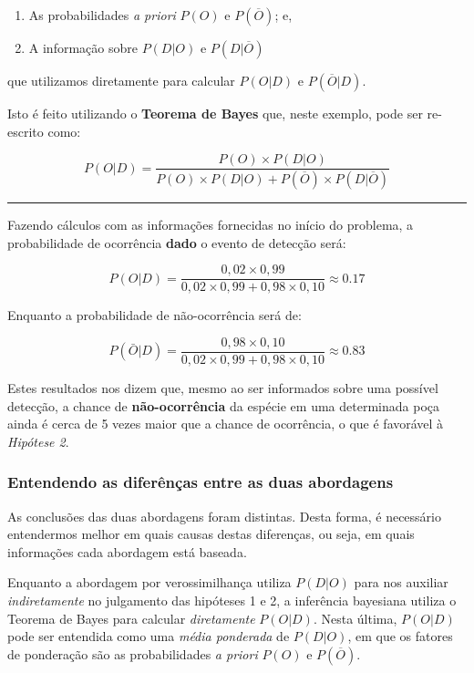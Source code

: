 \documentclass[
]{book}
\begin{document}
\begin{enumerate}
\def\labelenumi{\arabic{enumi}.}
\item
  As probabilidades \emph{a priori} \(P(O)\) e \(P(\overline{O})\); e,
\item
  A informação sobre \(P(D|O)\) e \(P(D|\overline{O})\)
\end{enumerate}

que utilizamos diretamente para calcular \(P(O|D)\) e \(P(\overline{O}|D)\).

Isto é feito utilizando o \textbf{Teorema de Bayes} que, neste exemplo, pode ser re-escrito como:

\[P(O|D) = \frac{P(O) \times P(D|O)}{P(O) \times P(D|O) + P(\overline{O}) \times P(D|\overline{O})}\]

\begin{center}\rule{0.5\linewidth}{0.5pt}\end{center}

Fazendo cálculos com as informações fornecidas no início do problema, a probabilidade de ocorrência \textbf{dado} o evento de detecção será:

\[P(O|D) = \frac{0,02 \times 0,99}{0,02 \times 0,99 + 0,98 \times 0,10} \approx 0.17\]

Enquanto a probabilidade de não-ocorrência será de:

\[P(\bar{O}|D) = \frac{0,98 \times 0,10}{0,02 \times 0,99 + 0,98 \times 0,10} \approx 0.83\]

Estes resultados nos dizem que, mesmo ao ser informados sobre uma possível detecção, a chance de \textbf{não-ocorrência} da espécie em uma determinada poça ainda é cerca de 5 vezes maior que a chance de ocorrência, o que é favorável à \emph{Hipótese 2}.

\hypertarget{entendendo-as-diferuxeanuxe7as-entre-as-duas-abordagens}{%
\subsubsection*{Entendendo as diferênças entre as duas abordagens}\label{entendendo-as-diferuxeanuxe7as-entre-as-duas-abordagens}}

As conclusões das duas abordagens foram distintas. Desta forma, é necessário entendermos melhor em quais causas destas diferenças, ou seja, em quais informações cada abordagem está baseada.

Enquanto a abordagem por verossimilhança utiliza \(P(D|O)\) para nos auxiliar \emph{indiretamente} no julgamento das hipóteses 1 e 2, a inferência bayesiana utiliza o Teorema de Bayes para calcular \emph{diretamente} \(P(O|D)\). Nesta última, \(P(O|D)\) pode ser entendida como uma \emph{média ponderada} de \(P(D|O)\), em que os fatores de ponderação são as probabilidades \emph{a priori} \(P(O)\) e \(P(\overline{O})\).
\end{document}
